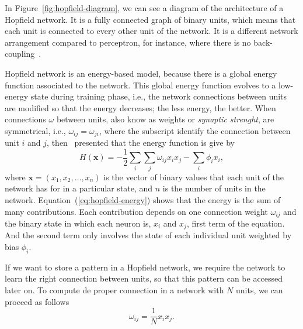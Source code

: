 In Figure~\ref{fig:hopfield-diagram}, we can see a diagram of the architecture of a Hopfield network.
It is a fully connected graph of binary units, which means that each unit is connected to every other unit of the network.
It is a different network arrangement compared to perceptron, for instance, where there is no back-coupling~\cite{bib:hopfield1982}.


Hopfield network is an energy-based model, because there is a global energy function associated to the network.
This global energy function evolves to a low-energy state during training phase, i.e., the network connections between units are modified so that the energy decreases; the less energy, the better.
When connections $\omega$ between units, also know as weights or \textit{synaptic strenght}, are symmetrical, i.e., $\omega_{ij} = \omega_{ji}$, where the subscript identify the connection between unit $i$ and $j$, then~ presented that the energy function is give by
\begin{equation}\label{eq:hopfield-energy}
  H(\mathbf{x}) = -\frac{1}{2}\sum_{i} \sum_{j} \omega_{ij} x_{i} x_{j} - \sum_{i} \phi_{i} x_{i},
\end{equation}
where $\mathbf{x} = (x_{1}, x_{2}, \dots, x_{n})$ is the vector of binary values that each unit of the network has for in a particular state, and $n$ is the number of units in the network.
Equation~(\ref{eq:hopfield-energy}) shows that the energy is the sum of many contributions.
Each contribution depends on one connection weight $\omega_{ij}$ and the binary state in which each neuron is, $x_{i}$ and $x_{j}$, first term of the equation.
And the second term only involves the state of each individual unit weighted by bias $\phi_{i}$.

If we want to store a pattern in a Hopfield network, we require the network to learn the right connection between units, so that this pattern can be accessed later on. To compute de proper connection in a network with $N$ units, we can proceed as follows
\begin{equation}
  \label{eq:hopfield-learn}
  \omega_{ij} = \frac{1}{N} x_{i} x_{j}.
\end{equation}

